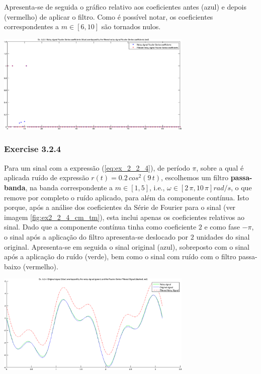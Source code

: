 \documentclass[a4paper]{article}
\begin{document}
\clearpage
\noindent Apresenta-se de seguida o gráfico relativo aos coeficientes antes (azul) e depois (vermelho) de aplicar o filtro. Como é possível notar, os coeficientes correspondentes a $m \in [6, 10]$ são tornados nulos.
\begin{center}
	\includegraphics[width=0.70\textwidth]{images/ex3_2_3_coeffs.png}
	\label{fig:ex3_2_3_coeffs}
\end{center}

\subsubsection{Exercise 3.2.4}
\noindent Para um sinal com a expressão (\ref{eq:ex_2_2_4}), de período $\pi$, sobre a qual é aplicada ruído de expressão $r(t) = 0.2 \, cos^2(9 \, t)$, escolhemos um filtro \textbf{passa-banda}, na banda correspondente a $m \in [1, 5]$, i.e., $\omega \in [2 \, \pi, 10 \, \pi] rad/s$, o que remove por completo o ruído aplicado, para além da componente contínua. Isto porque, após a análise dos coeficientes da Série de Fourier para o sinal (ver imagem \ref{fig:ex2_2_4_cm_tm}), esta inclui apenas os coeficientes relativos ao sinal. Dado que a componente contínua tinha como coeficiente $2$ e como fase $-\pi$, o sinal após a aplicação do filtro apresenta-se deslocado por $2$ unidades do sinal original. Apresenta-se em seguida o sinal original (azul), sobreposto com o sinal após a aplicação do ruído (verde), bem como o sinal com ruído com o filtro passa-baixo (vermelho).

\begin{center}
	\includegraphics[width=0.70\textwidth]{images/ex3_2_4_plot.png}
	\label{fig:ex3_2_4_plot}
\end{center}
\end{document}
